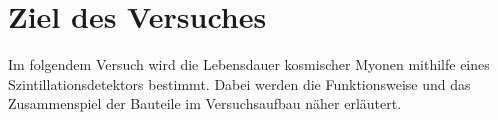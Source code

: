 \section{Ziel des Versuches}
\label{sec:Ziel}
Im folgendem Versuch wird die Lebensdauer kosmischer Myonen mithilfe eines Szintillationsdetektors bestimmt. Dabei werden die Funktionsweise und das Zusammenspiel der Bauteile im Versuchsaufbau näher erläutert.  